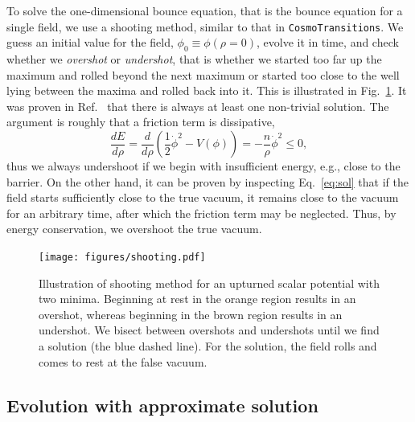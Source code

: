 \documentclass[final,3p,11pt,pdflatex]{elsarticle}
\makeatletter
\renewcommand{\tfrac}{\frac}
\newcommand{\cosmo}{\texttt{CosmoTransitions}\@\xspace}
\renewcommand{\refeq}[1]{Eq.~\ref{#1}}
\newcommand{\refcite}[1]{Ref.~\cite{#1}}
\makeatother
\begin{document}
To solve the one-dimensional bounce equation, that is the bounce equation for a single field, we use a shooting method, similar to that in \cosmo.  We guess an initial value for the field, $\phi_0 \equiv \phi(\rho = 0)$, evolve it in time, and check whether we \emph{overshot} or \emph{undershot}, that is whether we started too far up the maximum and rolled beyond the next maximum or started too close to the well lying between the maxima and rolled back into it.  This is illustrated in Fig.~\ref{fig:shooting}.  It was proven in \refcite{Coleman:1977py} that there is always at least one non-trivial solution.  The argument is roughly that a friction term is dissipative,
\begin{equation}
\frac{dE}{d\rho} = \frac{d}{d\rho} \left(\tfrac12\dot\phi^2 - V(\phi)\right) = -\tfrac{n}{\rho} \dot\phi^2 \le 0,
\end{equation}
thus we always undershoot if we begin with insufficient energy, e.g., close to the barrier.  On the other hand, it can be proven by inspecting \refeq{eq:sol} that if the field starts sufficiently close to the true vacuum, it remains close to the vacuum for an arbitrary time, after which the friction term may be neglected.  Thus, by energy conservation, we overshoot the true vacuum.

\begin{figure}
    \centering
    \texttt{[image: figures/shooting.pdf]}
    \caption{Illustration of shooting method for an upturned scalar potential
      with two minima. Beginning at rest in the orange region results in an
      overshot, whereas beginning in the brown region results in an undershot.
      We bisect between overshots and undershots until we find a solution
      (the blue dashed line). For the solution, the field rolls and comes to
      rest at the false vacuum.}
    \label{fig:shooting}
\end{figure}

\subsection{Evolution with approximate solution}\label{sec:evolve}
\end{document}
